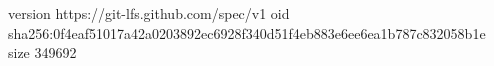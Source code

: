 version https://git-lfs.github.com/spec/v1
oid sha256:0f4eaf51017a42a0203892ec6928f340d51f4eb883e6ee6ea1b787c832058b1e
size 349692
